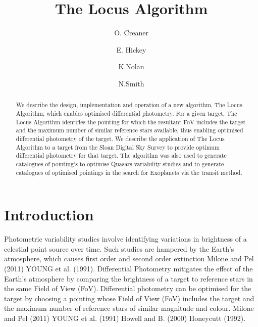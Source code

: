 \documentclass[]{elsarticle} %
\begin{document}
\begin{frontmatter}

  \title{The Locus Algorithm}
    \author[Dublin Institute for Advanced Studies]{O. Creaner}
    \author[Technological University Dublin]{E. Hickey}
  
    \author[Technological University Dublin]{K.Nolan}
  
    \author[Cork Institute of Technology]{N.Smith}
  
      \address[Dublin Institute for Advanced Studies]{Dublin Institute for Advanced Studies, 31 Fitzwilliam Place, Dublin 2,
Ireland}
    \address[Technological University Dublin]{Technological University Dublin, Tallaght Campus, Dublin 24, Ireland}
    \address[Cork Institute of Technology]{Cork Institute of Technology, Bishopstown, Cork, Ireland}
  
  \begin{abstract}
  We describe the design, implementation and operation of a new algorithm,
  The Locus Algorithm; which enables optimised differential photometry.
  For a given target, The Locus Algorithm identifies the pointing for
  which the resultant FoV includes the target and the maximum number of
  similar reference stars available, thus enabling optimised differential
  photometry of the target. We describe the application of The Locus
  Algorithm to a target from the Sloan Digital Sky Survey to provide
  optimum differential photometry for that target. The algorithm was also
  used to generate catalogues of pointing's to optimise Quasars
  variability studies and to generate catalogues of optimised pointings in
  the search for Exoplanets via the transit method.
  \end{abstract}
  
 \end{frontmatter}

\hypertarget{introduction}{%
\section{Introduction}\label{introduction}}

Photometric variability studies involve identifying variations in
brightness of a celestial point source over time. Such studies are
hampered by the Earth's atmosphere, which causes first order and second
order extinction Milone and Pel (2011) YOUNG et al. (1991). Differential
Photometry mitigates the effect of the Earth's atmosphere by comparing
the brightness of a target to reference stars in the same Field of View
(FoV). Differential photometry can be optimised for the target by
choosing a pointing whose Field of View (FoV) includes the target and
the maximum number of reference stars of similar magnitude and colour.
Milone and Pel (2011) YOUNG et al. (1991) Howell and B. (2000) Honeycutt
(1992).
\end{document}
